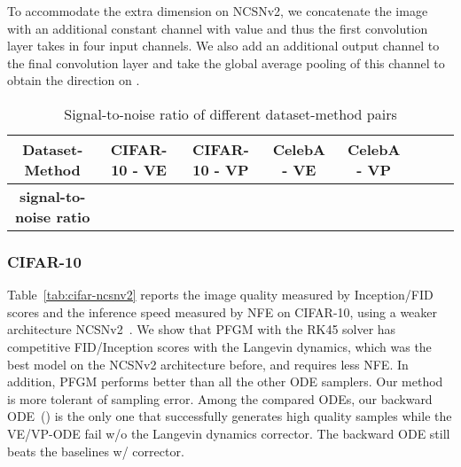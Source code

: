 To accommodate the extra dimension  on NCSNv2, we concatenate the image with an additional constant channel with value  and thus the first convolution layer takes in four input channels. We also add an additional output channel to the final convolution layer and take the global average pooling of this channel to obtain the direction on .

\begin{table}[htbp]
\begin{center}
\caption{Signal-to-noise ratio of different dataset-method pairs}
\label{table:s2n}
\begin{tabular}{c c c c c c c c}
		\toprule
		\textbf{Dataset-Method} &  CIFAR-10 - VE &CIFAR-10 - VP & CelebA - VE & CelebA - VP\\
		\midrule
        \textbf{signal-to-noise ratio} &   &  & &  \\
        \bottomrule
\end{tabular}
\end{center}
\end{table}

\label{app:ncsnv2}
\subsubsection{CIFAR-10}

Table~\ref{tab:cifar-ncsnv2} reports the image quality measured by Inception/FID scores and the inference speed measured by NFE on CIFAR-10, using a weaker architecture NCSNv2~\cite{Song2020ImprovedTF}. We show that PFGM with the RK45 solver has competitive FID/Inception scores with the Langevin dynamics, which was the best model on the NCSNv2 architecture before, and requires  less NFE. In addition, PFGM performs better than all the other ODE samplers. Our method is more tolerant of sampling error. Among the compared ODEs, our backward ODE~() is the only one that successfully generates high quality samples while the VE/VP-ODE fail w/o the Langevin dynamics corrector. The backward ODE still beats the baselines w/ corrector. 

